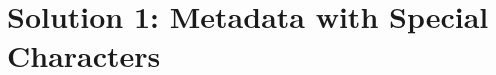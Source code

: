 \section{Solution 1:  Metadata with Special
Characters}\label{s:Implementation-Solution1}

% 	
% 		
% 	

